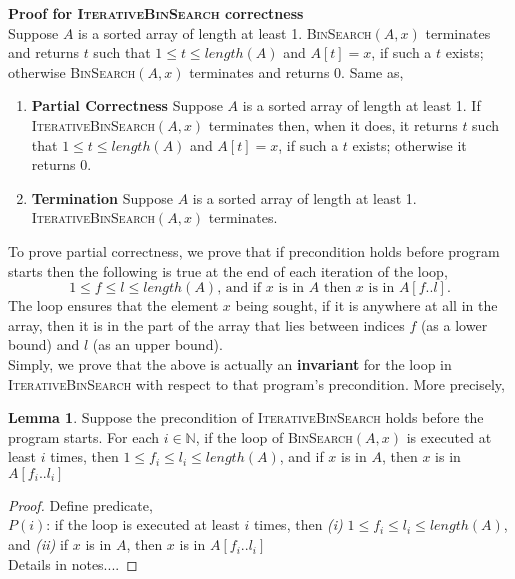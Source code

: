 \documentclass[11pt]{article}
\theoremstyle{plain}%
\theoremstyle{definition}
\newtheorem{lemma}{Lemma}[defn]
\theoremstyle{remark}
\newcommand{\N}{\mathbb{N}}
\begin{document}
$ $\\
\textbf{Proof for \textsc{IterativeBinSearch} correctness} \\
Suppose $A$ is a sorted array of length at least 1. \textsc{BinSearch}$(A,x)$ terminates and returns $t$ such that $1 \leq t \leq length(A)$ and $A[t] = x$, if such a $t$ exists; otherwise \textsc{BinSearch}$(A, x)$ terminates and returns 0. Same as,
\begin{enumerate}
  \item \textbf{Partial Correctness} Suppose $A$ is a sorted array of length at least 1. If \textsc{IterativeBinSearch}$(A, x)$ terminates then, when it does, it returns $t$ such that $1 \leq t \leq length(A)$ and $A[t] = x$, if such a $t$ exists; otherwise it returns 0.
  \item \textbf{Termination} Suppose $A$ is a sorted array of length at least 1. \textsc{IterativeBinSearch}$(A,x)$ terminates.
\end{enumerate}
$ $\\
To prove partial correctness, we prove that if precondition holds before program starts then the following is true at the end of each iteration of the loop,
\[
  1 \leq f \leq l \leq length(A)\text{, and if } x \text{ is in }A \text{ then }x \text{ is in }A[f..l].
\]
The loop ensures that the element $x$ being sought, if it is anywhere at all in the array, then it is in the part of the array that lies between indices $f$ (as a lower bound) and $l$ (as an upper bound).\\
Simply, we prove that the above is actually an \textbf{invariant} for the loop in \textsc{IterativeBinSearch} with respect to that program’s precondition. More precisely,\\

\begin{lemma}
  Suppose the precondition of \textsc{IterativeBinSearch} holds before the program starts. For each $i \in \N$, if the loop of \textsc{BinSearch}$(A, x)$ is executed at least $i$ times, then $1 \leq f_i \leq l_i \leq length(A)$, and if $x$ is in $A$, then $x$ is in $A[f_i..l_i]$
  \begin{proof}
    Define predicate,\\
    $P(i)$: if the loop is executed at least $i$ times, then \textit{(i)} $1 \leq f_i \leq l_i \leq length(A)$, and \textit{(ii)} if $x$ is in $A$, then $x$ is in $A[f_i..l_i]$\\
    Details in notes....
  \end{proof}
\end{lemma}
\end{document}
